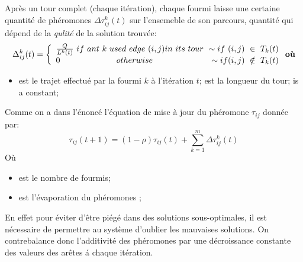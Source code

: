 Apr\`es un tour complet (chaque it\'eration), chaque fourmi laisse une certaine quantit\'e de ph\'eromones $ \Delta\tau_{ij}^k(t) $ sur l'ensemeble de son parcours, quantit\'e qui d\'epend de la \textit{qulit\'e} de la solution trouv\'ee:
\begin{equation}
\Delta_{ij}^k(t)= \left\{
\begin{array}{ll}

\frac{Q}{L^k(t)}\  if\ ant\ k\ used\ edge\ (i,j) in\ its\ tour\ \hfill \sim if\ (i,j)\ \in\ T_k(t)\\
0 \ \hfill  otherwise\ \hfill \sim if (i,j)\ \notin\ T_k(t)
\end{array}
\right.\textbf{o\`u}
\end{equation}

\begin{itemize}
\item {} est le trajet effectu\'e par la fourmi $k$ \`a l'it\'eration $t$;  est la longueur du tour;  is a constant;\\
\end{itemize}

Comme on a dans l'\'enonc\'e l'\'equation de mise \`a jour du ph\'eromone $ \tau_{ij} $ donn\'ee par:
\begin{equation}
\tau_{ij}(t+1) = (1-\rho)\tau_{ij}(t) + \displaystyle\sum_{k=1}^{m}\Delta\tau_{ij}^k(t)
\end{equation}
O\`u
\begin{itemize}
\item {} est le nombre de fourmis;
\item \boldmath{$\rho$} est l'évaporation du phéromones ;
\end{itemize}
En effet pour éviter d'être pi\'eg\'e dans des solutions sous-optimales, il est nécessaire de permettre au système d'oublier les mauvaises solutions. On contrebalance donc l'additivité  des phéromones par une décroissance constante des valeurs des ar\^etes \'a chaque itération.
